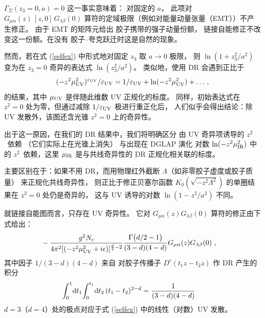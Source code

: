 $\Gamma_\Sigma (z_3=0,a) =0$ 这一事实意味着：
对固定的 $a$，
此项对
$G_{\mu \alpha} (z) \, [z,0]\, G_{\lambda \beta} (0)$
算符的定域极限（例如对能量动量张量（EMT））不产生修正。
由于 EMT 的矩阵元给出
胶子携带的强子动量份额，
链接自能修正不改变这一份额。在没有
胶子--夸克跃迁时这是自然的现象。

然而，若在式 (\ref{selfex}) 中形式地对固定 $z_3$ 取 $a\to 0$ 极限，
则 $\ln \left(1+{z_3^2}/{a^2}\right)$ 变为在 $z_3=0$ 奇异的表达式
$\ln \left({z_3^2}/{a^2}\right)$。
类似地，使用 DR 会遇到正比于
\begin{align}
(-z^2\mu_{\rm UV}^2)^{\varepsilon_{\rm UV}}/\varepsilon_{\rm UV}= 1/\varepsilon_{\rm UV} + \ln (-z^2 \mu_{\rm UV}^2) + \ldots \, ,
\end{align}
的结果，其中 $\mu_{\rm UV}$ 是伴随此维数 UV 正规化的标度。
同样，初始表达式在 $z^2=0$ 处为零，但通过减除 $1/\varepsilon_{\rm UV}$ 极进行重正化后，
人们似乎会得出结论：除 UV 发散外，该图还含光锥 $z^2=0$ 上的奇异性。

出于这一原因，在我们的 DR 结果中，我们将明确区分
由 UV 奇异项诱导的 \mbox{$z^2$ 依赖}
（它们实际上在光锥上消失）
与出现在 DGLAP 演化
对数 $\ln (-z^2 \mu_{\rm IR}^2)$ 中的 \mbox{$z^2$ 依赖}，这里 $\mu_{\rm IR}$ 是与共线奇异性的
DR 正规化相关联的标度。

主要区别在于：如果不用 DR，而用物理红外截断 $\Lambda$（如非零胶子虚度或胶子质量）
来正规化共线奇异性，
则正比于修正贝塞尔函数 $K_0 (\sqrt{-z^2 \Lambda^2})$ 的单圈结果在 $z^2=0$ 处仍是奇异的，
这与 UV 诱导的对数 $\ln (1-z^2/a^2)$ 不同。

就链接自能图而言，只存在 UV 奇异性。
它对 $G_{\mu \alpha}(z)G_{\lambda \beta}(0)$ 算符的修正由下式给出：
\begin{align}
&
-{g^2N_c \over 4\pi^2[(-z^2 \mu_{\rm UV}^2 +i\epsilon)]^{{d\over 2}-2}} {\Gamma\big({d/ 2}-1\big) \over (3-d)(4-d)}G_{\mu\alpha}(z)G_{\lambda \beta }(0) \ ,
\label{selfAD}
\end{align}
其中因子 $1/(3-d)(4-d)$ 来自
对胶子传播子 \mbox{$D^c (t_1z - t_2 z)$} 作 DR 产生的
积分
\begin{align}
&
\!\int_0^1\! \mathrm{d} t_1 \!\int_0^{t_1}\! \mathrm{d} t_2\, (t_1-t_2)^{2-d} ={1 \over (3-d)(4-d)}
\nonumber
\end{align}
$d=3$（$d=4$）处的极点对应于式 (\ref{selfex}) 中的线性（对数）UV 发散。
